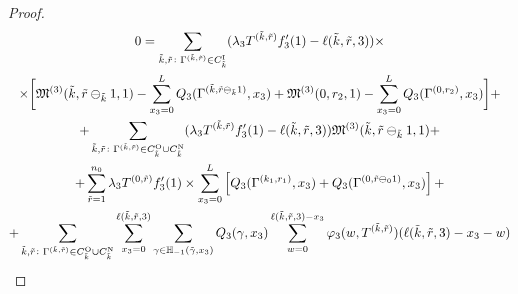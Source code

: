\documentclass[a4paper,12pt,russian]{extarticle}
\begin{document}
\begin{proof}
\begin{multline}
\allowdisplaybreaks
 0 = \sum_{\tilde{k},\tilde{r}\colon \Gamma^{(\tilde{k}, \tilde{r})} \in C_{\tilde{k}}^{\mathrm{I}}} (\lambda_3 T^{(\tilde{k},\tilde{r})} f_3'(1) - \ell(\tilde{k},\tilde{r},3))\times \\ 
     \times \biggl[\mathfrak{M}^{(3)}(\tilde{k},\tilde{r}\ominus_{\tilde{k}} 1,1) - \sum_{x_3=0}^L Q_3(\Gamma^{(\tilde{k},\tilde{r}\ominus_{\tilde{k}} 1)},x_3)   +  \mathfrak{M}^{(3)}(0,r_2,1) -   \sum_{x_3=0}^L  Q_3(\Gamma^{(0,r_2)},x_3)  \biggr]
 +\\+ \sum_{\tilde{k},\tilde{r}\colon \Gamma^{(\tilde{k}, \tilde{r})} \in C_{\tilde{k}}^{\mathrm{O}}\cup C_{\tilde{k}}^{\mathrm{N}}} (\lambda_3 T^{(\tilde{k},\tilde{r})} f_3'(1) - \ell(\tilde{k},\tilde{r},3)) \mathfrak{M}^{(3)}(\tilde{k},\tilde{r}\ominus_{\tilde{k}} 1,1)   +\\+ \sum_{\tilde{r}=1}^{n_0} \lambda_3 T^{(0,\tilde{r})} f_3'(1)  \times \sum_{x_3=0}^{L} \left[ Q_3(\Gamma^{(k_1,r_1)},x_3) + Q_3(\Gamma^{(0,\tilde{r}\ominus_0 1)},x_3) \right]   +\\+   \sum_{\tilde{k},\tilde{r}\colon \Gamma^{(\tilde{k}, \tilde{r})} \in C_{\tilde{k}}^{\mathrm{O}}\cup C_{\tilde{k}}^{\mathrm{N}}} \sum_{x_3=0}^{\ell(\tilde{k},\tilde{r},3)}\sum_{\gamma \in {\mathbb H}_{-1}(\tilde{\gamma},x_3)} Q_3(\gamma,x_3) \sum_{w=0}^{\ell(\tilde{k},\tilde{r},3) - x_3} \varphi_3(w,T^{(\tilde{k},\tilde{r})}) (\ell(\tilde{k},\tilde{r},3)-x_3 - w)
 \label{neccessary:to:paste}
\end{multline}


\end{proof}
\end{document}
